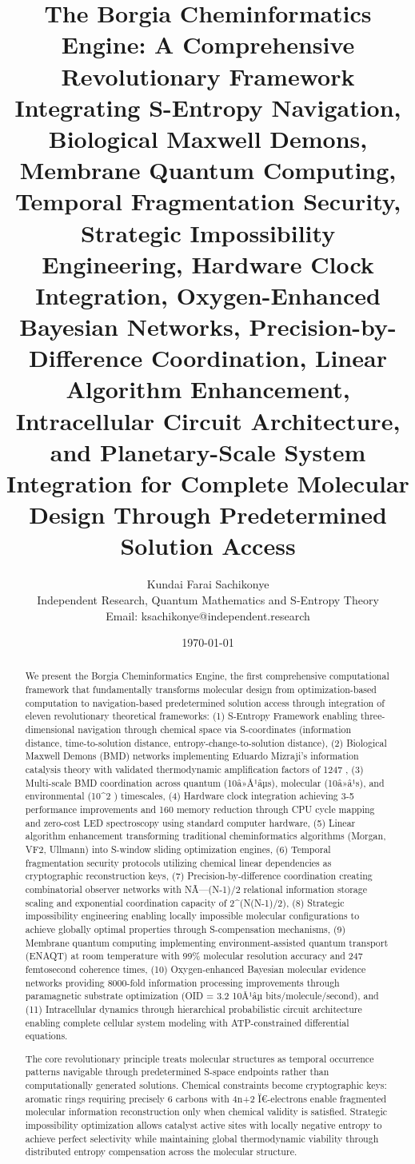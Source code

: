 \documentclass[11pt,a4paper]{article}
\title{The Borgia Cheminformatics Engine: A Comprehensive Revolutionary Framework Integrating S-Entropy Navigation, Biological Maxwell Demons, Membrane Quantum Computing, Temporal Fragmentation Security, Strategic Impossibility Engineering, Hardware Clock Integration, Oxygen-Enhanced Bayesian Networks, Precision-by-Difference Coordination, Linear Algorithm Enhancement, Intracellular Circuit Architecture, and Planetary-Scale System Integration for Complete Molecular Design Through Predetermined Solution Access}
\author{Kundai Farai Sachikonye\\
Independent Research, Quantum Mathematics and S-Entropy Theory\\
Email: ksachikonye@independent.research}
\date{\today}
\begin{document}
\maketitle

\begin{abstract}

We present the Borgia Cheminformatics Engine, the first comprehensive computational framework that fundamentally transforms molecular design from optimization-based computation to navigation-based predetermined solution access through integration of eleven revolutionary theoretical frameworks: (1) S-Entropy Framework enabling three-dimensional navigation through chemical space via S-coordinates (information distance, time-to-solution distance, entropy-change-to-solution distance), (2) Biological Maxwell Demons (BMD) networks implementing Eduardo Mizraji's information catalysis theory with validated thermodynamic amplification factors of 1247  \times, (3) Multi-scale BMD coordination across quantum (10â»Â¹âµs), molecular (10â»â¹s), and environmental (10^{2} ) timescales, (4) Hardware clock integration achieving 3-5 \times performance improvements and 160 \times memory reduction through CPU cycle mapping and zero-cost LED spectroscopy using standard computer hardware, (5) Linear algorithm enhancement transforming traditional cheminformatics algorithms (Morgan, VF2, Ullmann) into S-window sliding optimization engines, (6) Temporal fragmentation security protocols utilizing chemical linear dependencies as cryptographic reconstruction keys, (7) Precision-by-difference coordination creating combinatorial observer networks with NÃ—(N-1)/2 relational information storage scaling and exponential coordination capacity of 2^(N(N-1)/2), (8) Strategic impossibility engineering enabling locally impossible molecular configurations to achieve globally optimal properties through S-compensation mechanisms, (9) Membrane quantum computing implementing environment-assisted quantum transport (ENAQT) at room temperature with 99\% molecular resolution accuracy and 247  femtosecond coherence times, (10) Oxygen-enhanced Bayesian molecular evidence networks providing 8000-fold information processing improvements through paramagnetic substrate optimization (OID = 3.2 \times10Â¹âµ bits/molecule/second), and (11) Intracellular dynamics through hierarchical probabilistic circuit architecture enabling complete cellular system modeling with ATP-constrained differential equations.

The core revolutionary principle treats molecular structures as temporal occurrence patterns navigable through predetermined S-space endpoints rather than computationally generated solutions. Chemical constraints become cryptographic keys: aromatic rings requiring precisely 6 carbons with 4n+2 Ï€-electrons enable fragmented molecular information reconstruction only when chemical validity is satisfied. Strategic impossibility optimization allows catalyst active sites with locally negative entropy to achieve perfect selectivity while maintaining global thermodynamic viability through distributed entropy compensation across the molecular structure.


\end{abstract}
\end{document}
